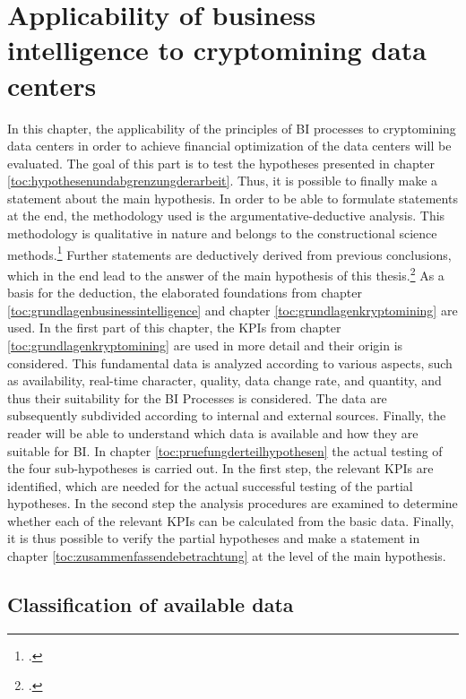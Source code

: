 \newpage
\section{Applicability of business intelligence to cryptomining data centers} \label{toc:ansatzmoeglichkeitenfuerbusinessintelligence}

In this chapter, the applicability of the principles of \ac{BI} processes to cryptomining data centers in order to achieve financial
optimization of the data centers will be evaluated. The goal of this part is to test the hypotheses presented in chapter
\ref{toc:hypothesenundabgrenzungderarbeit}. Thus, it is possible to finally make a statement about
the main hypothesis. In order to be able to formulate statements at the end, the methodology used is the
argumentative-deductive analysis. This methodology is qualitative in nature and belongs to the constructional science
methods.\footcite[Cf.][pp. 283]{wilde2007forschungsmethoden} Further statements are deductively derived from previous conclusions,
which in the end lead to the answer of the main hypothesis of this thesis.\footcite[Cf.][p. 7]{wilde2006methodenspektrum}
As a basis for the deduction, the elaborated foundations from
chapter \ref{toc:grundlagenbusinessintelligence} and chapter \ref{toc:grundlagenkryptomining} are used. In the first part
of this chapter, the \acp{KPI} from chapter \ref{toc:grundlagenkryptomining} are used in more detail and their origin is
considered. This fundamental data is analyzed according to various aspects, such as availability, real-time character,
quality, data change rate, and quantity, and thus their suitability for the \ac{BI} Processes is considered. The data
are subsequently subdivided according to internal and external sources. Finally, the reader will be able to understand which data is
available and how they are suitable for \ac{BI}. In chapter \ref{toc:pruefungderteilhypothesen} the actual testing of the
four sub-hypotheses is carried out. In the first step, the relevant \acp{KPI}
are identified, which are needed for the actual successful testing of the partial hypotheses. In the second step
the analysis procedures are examined to determine whether each of the relevant \acp{KPI} can be calculated from the basic data.
Finally, it is thus possible to verify the partial hypotheses and make a statement in chapter 
\ref{toc:zusammenfassendebetrachtung} at the level of the main hypothesis.

\subsection{Classification of available data} \label{toc:klassifizierungderdaten}

